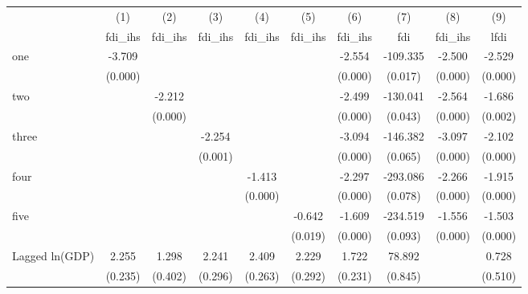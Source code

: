 \begin{tabular}{l*{9}{c}}
\hline\hline
            &\multicolumn{1}{c}{(1)}&\multicolumn{1}{c}{(2)}&\multicolumn{1}{c}{(3)}&\multicolumn{1}{c}{(4)}&\multicolumn{1}{c}{(5)}&\multicolumn{1}{c}{(6)}&\multicolumn{1}{c}{(7)}&\multicolumn{1}{c}{(8)}&\multicolumn{1}{c}{(9)}\\
            &\multicolumn{1}{c}{fdi\_ihs}&\multicolumn{1}{c}{fdi\_ihs}&\multicolumn{1}{c}{fdi\_ihs}&\multicolumn{1}{c}{fdi\_ihs}&\multicolumn{1}{c}{fdi\_ihs}&\multicolumn{1}{c}{fdi\_ihs}&\multicolumn{1}{c}{fdi}&\multicolumn{1}{c}{fdi\_ihs}&\multicolumn{1}{c}{lfdi}\\
\hline
one         &      -3.709&            &            &            &            &      -2.554&    -109.335&      -2.500&      -2.529\\
            &     (0.000)&            &            &            &            &     (0.000)&     (0.017)&     (0.000)&     (0.000)\\
[1em]
two         &            &      -2.212&            &            &            &      -2.499&    -130.041&      -2.564&      -1.686\\
            &            &     (0.000)&            &            &            &     (0.000)&     (0.043)&     (0.000)&     (0.002)\\
[1em]
three       &            &            &      -2.254&            &            &      -3.094&    -146.382&      -3.097&      -2.102\\
            &            &            &     (0.001)&            &            &     (0.000)&     (0.065)&     (0.000)&     (0.000)\\
[1em]
four        &            &            &            &      -1.413&            &      -2.297&    -293.086&      -2.266&      -1.915\\
            &            &            &            &     (0.000)&            &     (0.000)&     (0.078)&     (0.000)&     (0.000)\\
[1em]
five        &            &            &            &            &      -0.642&      -1.609&    -234.519&      -1.556&      -1.503\\
            &            &            &            &            &     (0.019)&     (0.000)&     (0.093)&     (0.000)&     (0.000)\\
[1em]
Lagged ln(GDP)&       2.255&       1.298&       2.241&       2.409&       2.229&       1.722&      78.892&            &       0.728\\
            &     (0.235)&     (0.402)&     (0.296)&     (0.263)&     (0.292)&     (0.231)&     (0.845)&            &     (0.510)\\

\end{tabular}

